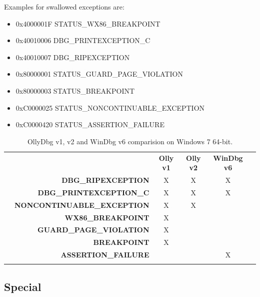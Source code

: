 \documentclass[10pt,a4paper]{article}
\begin{document}
Examples for swallowed exceptions are:

\begin{itemize}
\item 0x4000001F STATUS\_WX86\_BREAKPOINT
\item 0x40010006 DBG\_PRINTEXCEPTION\_C
\item 0x40010007 DBG\_RIPEXCEPTION
\item 0x80000001 STATUS\_GUARD\_PAGE\_VIOLATION
\item 0x80000003 STATUS\_BREAKPOINT
\item 0xC0000025 STATUS\_NONCONTINUABLE\_EXCEPTION
\item 0xC0000420 STATUS\_ASSERTION\_FAILURE
\end{itemize}

\begin{table}[H]
\caption{OllyDbg v1, v2 and WinDbg v6 comparision on Windows 7 64-bit.}
\begin{tabular}{lrcccl}
 & \multicolumn{1}{c}{} & \textbf{Olly v1}    & \textbf{Olly v2}    & \textbf{WinDbg v6}    &  \\
 & \textbf{DBG\_RIPEXCEPTION}     & X                    & X                    & X                    &  \\
 & \textbf{DBG\_PRINTEXCEPTION\_C}      & X                    & X                    & X                    &  \\
 & \textbf{NONCONTINUABLE\_EXCEPTION}      & X                    & X                    &                     &  \\
 & \textbf{WX86\_BREAKPOINT}      & X                    &                     &                     &  \\
 & \textbf{GUARD\_PAGE\_VIOLATION}      & X                    &                     &                     &  \\
 & \textbf{BREAKPOINT}      & X                    &                     &                     &  \\
 & \textbf{ASSERTION\_FAILURE}      &                     &                     & X                    &  \\
 & \multicolumn{1}{l}{} & \multicolumn{1}{l}{} & \multicolumn{1}{l}{} & \multicolumn{1}{l}{} & 
\end{tabular}
\end{table}

\subsection{Special}
\end{document}
